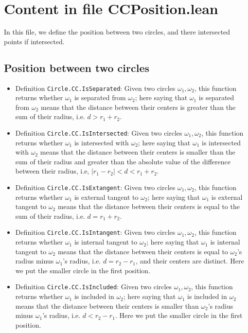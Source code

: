\documentclass[12pt]{amsart}
\begin{document}
\section{Content in file CCPosition.lean}
In this file, we define the position between two circles, and there intersected points if intersected.

\subsection{Position between two circles}
\begin{itemize}
    \item Definition \verb|Circle.CC.IsSeparated|: Given two circles $\omega_1,\omega_2$, this function returns whether $\omega_1$ is separated from $\omega_2$; here saying that $\omega_1$ is separated from $\omega_2$ means that the distance between their centers is greater than the sum of their radius, i.e. $d > r_1 + r_2$.
    \item Definition \verb|Circle.CC.IsIntersected|: Given two circles $\omega_1,\omega_2$, this function returns whether $\omega_1$ is intersected with $\omega_2$; here saying that $\omega_1$ is intersected with $\omega_2$ means that the distance between their centers is smaller than the sum of their radius and greater than the absolute value of the difference between their radius, i.e, $|r_1-r_2|<d<r_1+r_2$.
    \item Definition \verb|Circle.CC.IsExtangent|: Given two circles $\omega_1,\omega_2$, this function returns whether $\omega_1$ is external tangent to $\omega_2$; here saying that $\omega_1$ is external tangent to $\omega_2$ means that the distance between their centers is equal to the sum of their radius, i.e. $d = r_1 + r_2$.
    \item Definition \verb|Circle.CC.IsIntangent|: Given two circles $\omega_1,\omega_2$, this function returns whether $\omega_1$ is internal tangent to $\omega_2$; here saying that $\omega_1$ is internal tangent to $\omega_2$ means that the distance between their centers is equal to $\omega_2$'s radius minus $\omega_1$'s radius, i.e. $d = r_2 - r_1$, and their centers are distinct. {\color{blue} Here we put the smaller circle in the first position.}
    \item Definition \verb|Circle.CC.IsIncluded|: Given two circles $\omega_1,\omega_2$, this function returns whether $\omega_1$ is included in $\omega_2$; here saying that $\omega_1$ is included in $\omega_2$ means that the distance between their centers is smaller than $\omega_2$'s radius minus $\omega_1$'s radius, i.e. $d < r_2 - r_1$. {\color{blue} Here we put the smaller circle in the first position.}

\end{itemize}
\end{document}
